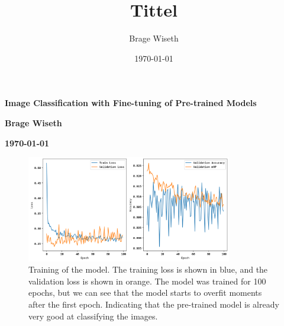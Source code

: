 \documentclass{article}[9pt]
\title{Tittel}%
\author{Brage Wiseth}%
\date{\today}%
\begin{document}
%
    \begin{center}
        \textbf{\LARGE Image Classification with Fine-tuning of Pre-trained Models}
    \end{center}
    \vspace{0.5em}
    \begin{center}
        \textbf{Brage Wiseth}
    \end{center}
    \begin{center}
        \textbf{\today}
    \end{center}
    \vspace{0.5em}



\begin{figure}[!ht]
    \centering
    \includegraphics[width=0.8\textwidth]{training.png}
    \caption{Training of the model. The training loss is shown in blue, and the validation 
    loss is shown in orange. The model was trained for 100 epochs, but we can see that the model
    starts to overfit moments after the first epoch. Indicating that the pre-trained model is
    already very good at classifying the images.}
    \label{fig:training}
\end{figure}
\end{document}
